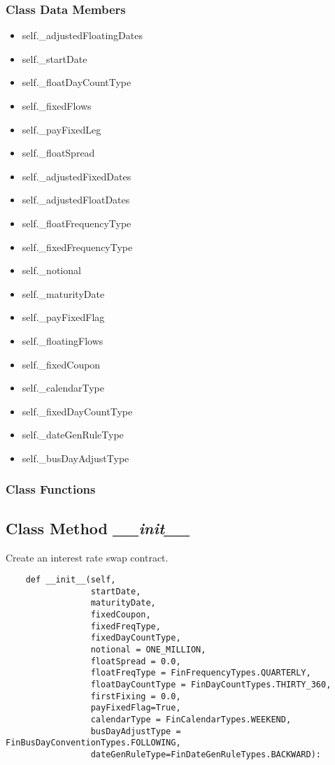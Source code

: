 \documentclass[twoside,11pt]{book}
\begin{document}
\subsubsection{Class Data Members}
\begin{itemize}
\item{self.\_adjustedFloatingDates}
\item{self.\_startDate}
\item{self.\_floatDayCountType}
\item{self.\_fixedFlows}
\item{self.\_payFixedLeg}
\item{self.\_floatSpread}
\item{self.\_adjustedFixedDates}
\item{self.\_adjustedFloatDates}
\item{self.\_floatFrequencyType}
\item{self.\_fixedFrequencyType}
\item{self.\_notional}
\item{self.\_maturityDate}
\item{self.\_payFixedFlag}
\item{self.\_floatingFlows}
\item{self.\_fixedCoupon}
\item{self.\_calendarType}
\item{self.\_fixedDayCountType}
\item{self.\_dateGenRuleType}
\item{self.\_busDayAdjustType}
\end{itemize}

\subsubsection{Class Functions}

\subsection{Class Method {\it \_\_init\_\_}}
Create an interest rate swap contract. 

\begin{lstlisting}
    def __init__(self, 
                 startDate, 
                 maturityDate,
                 fixedCoupon, 
                 fixedFreqType, 
                 fixedDayCountType,
                 notional = ONE_MILLION,
                 floatSpread = 0.0, 
                 floatFreqType = FinFrequencyTypes.QUARTERLY, 
                 floatDayCountType = FinDayCountTypes.THIRTY_360,
                 firstFixing = 0.0,
                 payFixedFlag=True,
                 calendarType = FinCalendarTypes.WEEKEND,
                 busDayAdjustType = FinBusDayConventionTypes.FOLLOWING,
                 dateGenRuleType=FinDateGenRuleTypes.BACKWARD):
\end{lstlisting}
\end{document}
